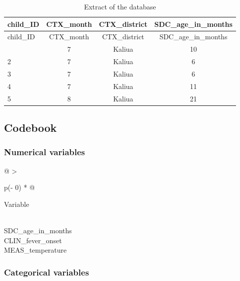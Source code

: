 \documentclass[
  letterpaper,
  DIV=11,
  numbers=noendperiod,
  oneside]{scrreprt}
\begin{document}
\begin{longtable}[]{@{}lccc@{}}
\caption{Extract of the database}\tabularnewline
\toprule\noalign{}
child\_ID & CTX\_month & CTX\_district & SDC\_age\_in\_months \\
\midrule\noalign{}
\endfirsthead
\toprule\noalign{}
child\_ID & CTX\_month & CTX\_district & SDC\_age\_in\_months \\
\midrule\noalign{}
\endhead
\bottomrule\noalign{}
\endlastfoot
1 & 7 & Kaliua & 10 \\
2 & 7 & Kaliua & 6 \\
3 & 7 & Kaliua & 6 \\
4 & 7 & Kaliua & 11 \\
5 & 8 & Kaliua & 21 \\
\end{longtable}

\hypertarget{codebook-3}{%
\subsection{Codebook}\label{codebook-3}}

\hypertarget{numerical-variables}{%
\subsubsection{Numerical variables}\label{numerical-variables}}

\begin{longtable}[]{@{}
  >{\raggedright\arraybackslash}p{(\columnwidth - 0\tabcolsep) * }@{}}
\toprule\noalign{}
\begin{minipage}[b]{\linewidth}\raggedright
Variable
\end{minipage} \\
\midrule\noalign{}
\endhead
\bottomrule\noalign{}
\endlastfoot
SDC\_age\_in\_months \\
CLIN\_fever\_onset \\
MEAS\_temperature \\
\end{longtable}

\hypertarget{categorical-variables}{%
\subsubsection{Categorical variables}\label{categorical-variables}}
\end{document}
